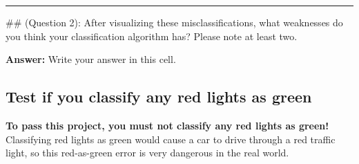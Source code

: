 \documentclass[11pt]{article}
\begin{document}
    \begin{center}
    \end{center}
    { \hspace*{\fill} \\}
    
    \begin{center}
    \end{center}
    { \hspace*{\fill} \\}
    
    \begin{center}
    \end{center}
    { \hspace*{\fill} \\}
    
    \begin{center}
    \end{center}
    { \hspace*{\fill} \\}
    
    \begin{center}
    \end{center}
    { \hspace*{\fill} \\}
    
    \begin{center}\rule{0.5\linewidth}{\linethickness}\end{center}

 \#\# (Question 2): After visualizing these misclassifications, what
weaknesses do you think your classification algorithm has? Please note
at least two.

    \textbf{Answer:} Write your answer in this cell.

    \hypertarget{test-if-you-classify-any-red-lights-as-green}{%
\subsection{Test if you classify any red lights as
green}\label{test-if-you-classify-any-red-lights-as-green}}

\textbf{To pass this project, you must not classify any red lights as
green!} Classifying red lights as green would cause a car to drive
through a red traffic light, so this red-as-green error is very
dangerous in the real world.
\end{document}
